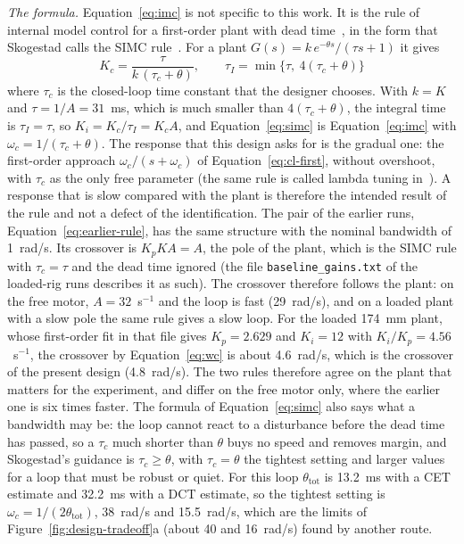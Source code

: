 \emph{The formula.} Equation~\ref{eq:imc} is not specific to this work. It is the rule of internal model control for a first-order plant with dead time~\citep{rivera1986}, in the form that Skogestad calls the SIMC rule~\citep{skogestad2003}. For a plant $G(s) = k\,e^{-\theta s}/(\tau s + 1)$ it gives
\begin{equation}
    K_c = \frac{\tau}{k\,(\tau_c + \theta)}, \qquad \tau_I = \min\{\tau,\ 4(\tau_c + \theta)\}
    \label{eq:simc}
\end{equation}
where $\tau_c$ is the closed-loop time constant that the designer chooses. With $k = K$ and $\tau = 1/A = 31$~ms, which is much smaller than $4(\tau_c + \theta)$, the integral time is $\tau_I = \tau$, so $K_i = K_c/\tau_I = K_c A$, and Equation~\ref{eq:simc} is Equation~\ref{eq:imc} with $\omega_c = 1/(\tau_c + \theta)$. The response that this design asks for is the gradual one: the first-order approach $\omega_c/(s + \omega_c)$ of Equation~\ref{eq:cl-first}, without overshoot, with $\tau_c$ as the only free parameter (the same rule is called lambda tuning in~\citet{astromhagglund2006}). A response that is slow compared with the plant is therefore the intended result of the rule and not a defect of the identification. The pair of the earlier runs, Equation~\ref{eq:earlier-rule}, has the same structure with the nominal bandwidth of 1~rad/s. Its crossover is $K_p K A = A$, the pole of the plant, which is the SIMC rule with $\tau_c = \tau$ and the dead time ignored (the file \texttt{baseline\_gains.txt} of the loaded-rig runs describes it as such). The crossover therefore follows the plant: on the free motor, $A = 32$~s$^{-1}$ and the loop is fast (29~rad/s), and on a loaded plant with a slow pole the same rule gives a slow loop. For the loaded 174~mm plant, whose first-order fit in that file gives $K_p = 2.629$ and $K_i = 12$ with $K_i/K_p = 4.56$~s$^{-1}$, the crossover by Equation~\ref{eq:wc} is about 4.6~rad/s, which is the crossover of the present design (4.8~rad/s). The two rules therefore agree on the plant that matters for the experiment, and differ on the free motor only, where the earlier one is six times faster. The formula of Equation~\ref{eq:simc} also says what a bandwidth may be: the loop cannot react to a disturbance before the dead time has passed, so a $\tau_c$ much shorter than $\theta$ buys no speed and removes margin, and Skogestad's guidance is $\tau_c \geq \theta$, with $\tau_c = \theta$ the tightest setting and larger values for a loop that must be robust or quiet. For this loop $\theta_{\mathrm{tot}}$ is 13.2~ms with a CET estimate and 32.2~ms with a DCT estimate, so the tightest setting is $\omega_c = 1/(2\theta_{\mathrm{tot}})$, 38~rad/s and 15.5~rad/s, which are the limits of Figure~\ref{fig:design-tradeoff}a (about 40 and 16~rad/s) found by another route.

